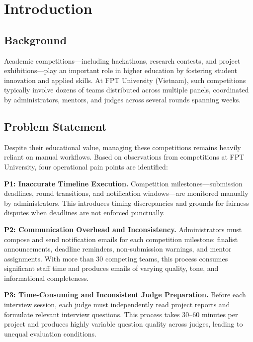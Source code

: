 \documentclass[runningheads]{llncs}
\begin{document}
\section{Introduction}

\subsection{Background}

Academic competitions---including hackathons, research contests, and project exhibitions---play an important role in higher education by fostering student innovation and applied skills. At FPT University (Vietnam), such competitions typically involve dozens of teams distributed across multiple panels, coordinated by administrators, mentors, and judges across several rounds spanning weeks.

\subsection{Problem Statement}

Despite their educational value, managing these competitions remains heavily reliant on manual workflows. Based on observations from competitions at FPT University, four operational pain points are identified:

\textbf{P1: Inaccurate Timeline Execution.} Competition milestones---submission deadlines, round transitions, and notification windows---are monitored manually by administrators. This introduces timing discrepancies and grounds for fairness disputes when deadlines are not enforced punctually.

\textbf{P2: Communication Overhead and Inconsistency.} Administrators must compose and send notification emails for each competition milestone: finalist announcements, deadline reminders, non-submission warnings, and mentor assignments. With more than 30 competing teams, this process consumes significant staff time and produces emails of varying quality, tone, and informational completeness.

\textbf{P3: Time-Consuming and Inconsistent Judge Preparation.} Before each interview session, each judge must independently read project reports and formulate relevant interview questions. This process takes 30--60 minutes per project and produces highly variable question quality across judges, leading to unequal evaluation conditions.
\end{document}
